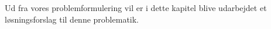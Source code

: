 Ud fra vores problemformulering vil er i dette kapitel blive udarbejdet et løsningsforslag til denne problematik. \wip{}